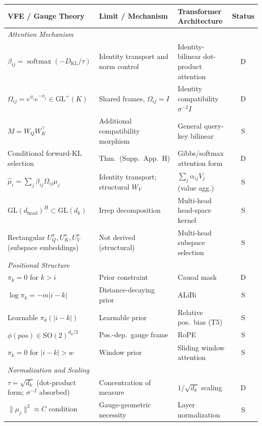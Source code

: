 \documentclass[twoside,11pt]{article}
\newcommand{\softmax}{\operatorname{softmax}}
\newcommand{\KL}{\operatorname{KL}}
\begin{document}
\begin{table}[p]
\centering
\renewcommand{\arraystretch}{1.15}
\setlength{\tabcolsep}{4pt}
\small
\begin{tabular}{|l|l|l|c|}
\hline
\textbf{VFE / Gauge Theory} & \textbf{Limit / Mechanism} & \textbf{Transformer Architecture} & \textbf{Status} \\
\hline
\multicolumn{4}{|l|}{\textit{Attention Mechanism}} \\
\hline
$\beta_{ij} = \softmax(-D_{\KL}/\tau)$ & Identity transport and norm control & Identity-bilinear dot-product attention & D \\
$\Omega_{ij} = e^{\phi_i}e^{-\phi_j} \in \mathrm{GL}^+(K)$ & Shared frames, $\Omega_{ij} = I$ & Identity compatibility $\sigma^{-2}I$ & D \\
$M = W_QW_K^\top$ & Additional compatibility morphism & General query-key bilinear & S \\
Conditional forward-KL selection & Thm.\ (Supp.~App.~H) & Gibbs/softmax attention form & D \\
$\hat\mu_i = \sum_j \beta_{ij}\Omega_{ij}\mu_j$ & Identity transport; structural $W_V$ & $\sum_j \alpha_{ij} V_j$ (value agg.) & S \\
$\mathrm{GL}(d_{\text{head}})^H \subset \mathrm{GL}(d_k)$ & Irrep decomposition & Multi-head head-space kernel & S \\
Rectangular $U_Q^a, U_K^a, U_V^a$ (subspace embeddings) & Not derived (structural) & Multi-head subspace selection & S \\
\hline
\multicolumn{4}{|l|}{\textit{Positional Structure}} \\
\hline
$\pi_k = 0$ for $k > i$ & Prior constraint & Causal mask & D \\
$\log\pi_k = -m|i - k|$ & Distance-decaying prior & ALiBi & S \\
Learnable $\pi_k(|i - k|)$ & Learnable prior & Relative pos.\ bias (T5) & S \\
$\phi(pos) \in \mathrm{SO}(2)^{d_k/2}$ & Pos.-dep.\ gauge frame & RoPE & S \\
$\pi_k = 0$ for $|i - k|>w$ & Window prior & Sliding window attention & S \\
\hline
\multicolumn{4}{|l|}{\textit{Normalization and Scaling}} \\
\hline
$\tau = \sqrt{d_k}$ (dot-product form; $\sigma^{-2}$ absorbed) & Concentration of measure & $1/\sqrt{d_k}$ scaling & D \\
$\|\mu_j\|^2 \approx C$ condition & Gauge-geometric necessity & Layer normalization & S \\

\end{tabular}
\end{table}
\end{document}

